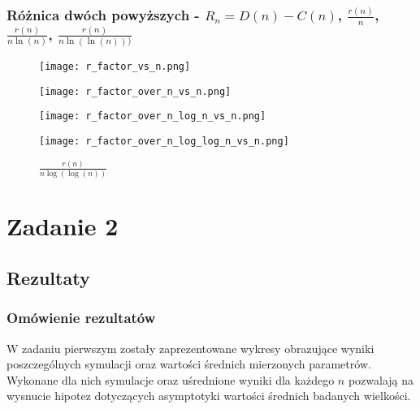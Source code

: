 \documentclass{article}
\begin{document}
\subsubsection{Różnica dwóch powyższych - $R_n=D(n)-C(n)$, $\frac{r(n)}{n}$, $\frac{r(n)}{n\ln(n)}$, $\frac{r(n)}{n\ln(\ln(n)))}$}

\begin{figure}[H]
    \centering
        \begin{minipage}{0.24\textwidth}
        \centering
        \texttt{[image: r\_factor\_vs\_n.png]}
        \caption{$R(n)=D(n)-C(n)$}
    \end{minipage}
        \begin{minipage}{0.24\textwidth}
        \centering
        \texttt{[image: r\_factor\_over\_n\_vs\_n.png]}
        \caption{$\frac{r(n)}{n}$}
    \end{minipage}
        \begin{minipage}{0.24\textwidth}
        \centering
        \texttt{[image: r\_factor\_over\_n\_log\_n\_vs\_n.png]}
        \caption{$\frac{r(n)}{n \log(n)}$}
    \end{minipage}
    \begin{minipage}{0.24\textwidth}
        \centering
        \texttt{[image: r\_factor\_over\_n\_log\_log\_n\_vs\_n.png]}
        \caption{$\frac{r(n)}{n \log(\log(n))}$}
    \end{minipage}
\end{figure}

\section{Zadanie 2}

\subsection{Rezultaty}

\subsubsection{Omówienie rezultatów}

W zadaniu pierwszym zostały zaprezentowane wykresy obrazujące wyniki poszczególnych symulacji oraz wartości średnich mierzonych parametrów. Wykonane dla nich symulacje oraz uśrednione wyniki dla każdego $n$ pozwalają na wysnucie hipotez dotyczących asymptotyki wartości średnich badanych wielkości.
\end{document}
